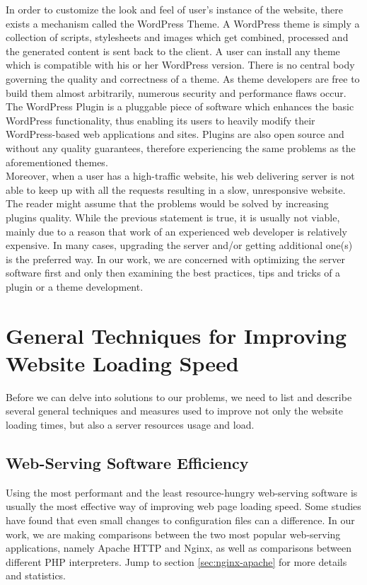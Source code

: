 In order to customize the look and feel of user’s instance of the website, there exists a mechanism called the WordPress Theme. A WordPress theme is simply a collection of scripts, stylesheets and images which get combined, processed and the generated content is sent back to the client. A user can install any theme which is compatible with his or her WordPress version. There is no central body governing the quality and correctness of a theme. As theme developers are free to build them almost arbitrarily, numerous security and performance flaws occur. The WordPress Plugin is a pluggable piece of software which enhances the basic WordPress functionality, thus enabling its users to heavily modify their WordPress-based web applications and sites. Plugins are also open source and without any quality guarantees, therefore experiencing the same problems as the aforementioned themes. \\

Moreover, when a user has a high-traffic website, his web delivering server is not able to keep up with all the requests resulting in a slow, unresponsive website. The reader might assume that the problems would be solved by increasing plugins quality. While the previous statement is true, it is usually not viable, mainly due to a reason that work of an experienced web developer is relatively expensive. In many cases, upgrading the server and/or getting additional one(s) is the preferred way. In our work, we are concerned with optimizing the server software first and only then examining the best practices, tips and tricks of a plugin or a theme development.

\section{General Techniques for Improving Website Loading Speed}

Before we can delve into solutions to our problems, we need to list and describe several general techniques and measures used to improve not only the website loading times, but also a server resources usage and load.

\subsection{Web-Serving Software Efficiency}

Using the most performant and the least resource-hungry web-serving software is usually the most effective way of improving web page loading speed. Some studies have found that even small changes to configuration files can a difference. In our work, we are making comparisons between the two most popular web-serving applications, namely Apache HTTP and Nginx, as well as comparisons between different PHP interpreters. Jump to section \ref{sec:nginx-apache} for more details and statistics. 

